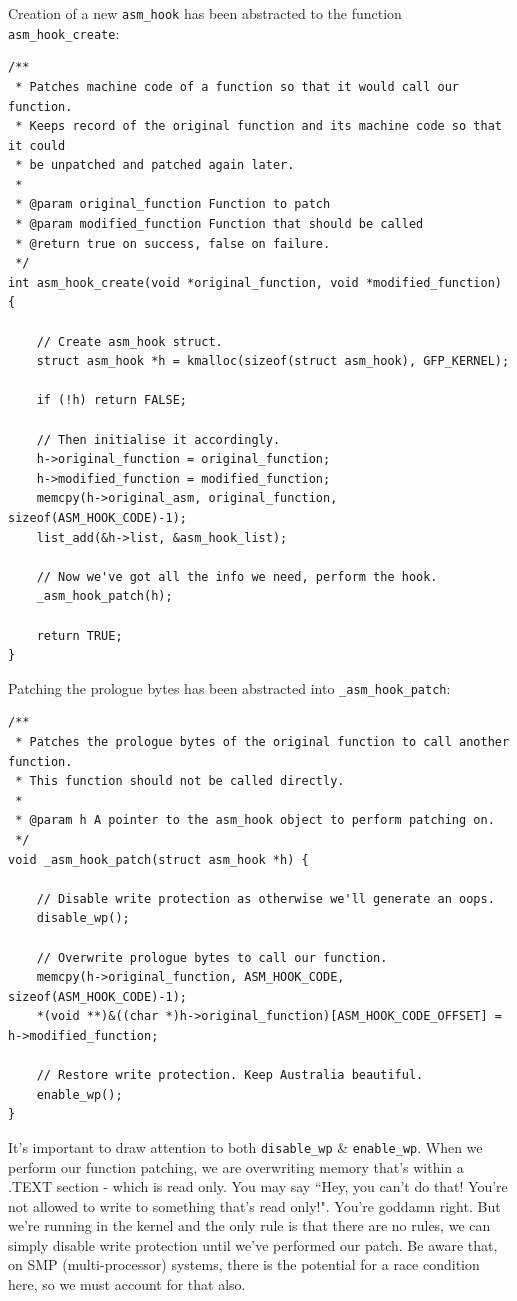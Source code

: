\documentclass[11pt]{article}
\begin{document}
Creation of a new \texttt{asm_hook} has been abstracted to the function \texttt{asm_hook_create}:
\begin{verbatim}
/**
 * Patches machine code of a function so that it would call our function.
 * Keeps record of the original function and its machine code so that it could
 * be unpatched and patched again later.
 *
 * @param original_function Function to patch
 * @param modified_function Function that should be called
 * @return true on success, false on failure.
 */
int asm_hook_create(void *original_function, void *modified_function) {

    // Create asm_hook struct.
    struct asm_hook *h = kmalloc(sizeof(struct asm_hook), GFP_KERNEL);

    if (!h) return FALSE;

    // Then initialise it accordingly.
    h->original_function = original_function;
    h->modified_function = modified_function;
    memcpy(h->original_asm, original_function, sizeof(ASM_HOOK_CODE)-1);
    list_add(&h->list, &asm_hook_list);

    // Now we've got all the info we need, perform the hook.
    _asm_hook_patch(h);

    return TRUE;
}
\end{verbatim}

Patching the prologue bytes has been abstracted into \texttt{_asm_hook_patch}:
\begin{verbatim}
/**
 * Patches the prologue bytes of the original function to call another function.
 * This function should not be called directly.
 *
 * @param h A pointer to the asm_hook object to perform patching on.
 */
void _asm_hook_patch(struct asm_hook *h) {

    // Disable write protection as otherwise we'll generate an oops.
    disable_wp();

    // Overwrite prologue bytes to call our function.
    memcpy(h->original_function, ASM_HOOK_CODE, sizeof(ASM_HOOK_CODE)-1);
    *(void **)&((char *)h->original_function)[ASM_HOOK_CODE_OFFSET] = h->modified_function;

    // Restore write protection. Keep Australia beautiful.
    enable_wp();
}
\end{verbatim}
It's important to draw attention to both \texttt{disable_wp} \& \texttt{enable_wp}. When we perform our function patching, we are overwriting memory that's within a .TEXT section - which is read only. You may say ``Hey, you can't do that! You're not allowed to write to something that's read only!". You're goddamn right. But we're running in the kernel and the only rule is that there are no rules, we can simply disable write protection until we've performed our patch. Be aware that, on SMP (multi-processor) systems, there is the potential for a race condition here, so we must account for that also.
\end{document}
